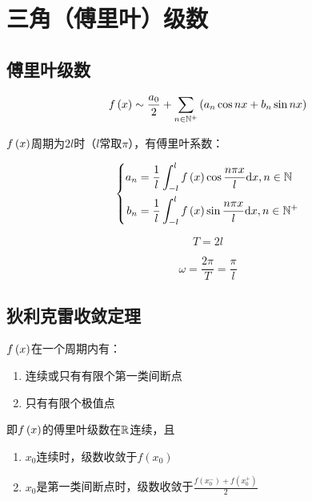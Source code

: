 \documentclass{article}
\begin{document}
\section{三角（傅里叶）级数}

\subsection{傅里叶级数}

\[f\left(x\right)\sim
    \frac{a_0}2+\sum_{n\in\mathbb N^+}\left(a_n\cos nx+b_n\sin nx\right)\]

$f\left(x\right)$周期为$2l$时（$l$常取$\pi$），有傅里叶系数：

\[\left\{\begin{aligned}
        a_n & =\frac1l\int_{-l}^lf\left(x\right)\cos\frac{n\pi x}l\mathrm d x,n\in\mathbb N  \\
        b_n & =\frac1l\int_{-l}^lf\left(x\right)\sin\frac{n\pi x}l\mathrm d x,n\in\mathbb N^+
    \end{aligned}\right.\]

\[T=2l\]

\[\omega=\frac{2\pi}T=\frac\pi l\]

\subsection{狄利克雷收敛定理}

$f\left(x\right)$在一个周期内有：

\begin{enumerate}
    \item 连续或只有有限个第一类间断点
    \item 只有有限个极值点
\end{enumerate}

即$f\left(x\right)$的傅里叶级数在$\mathbb R$连续，且

\begin{enumerate}
    \item $x_0$连续时，级数收敛于$f(x_0)$
    \item $x_0$是第一类间断点时，级数收敛于$\frac{f(x_0^-)+f(x_0^+)}2$
\end{enumerate}
\end{document}
